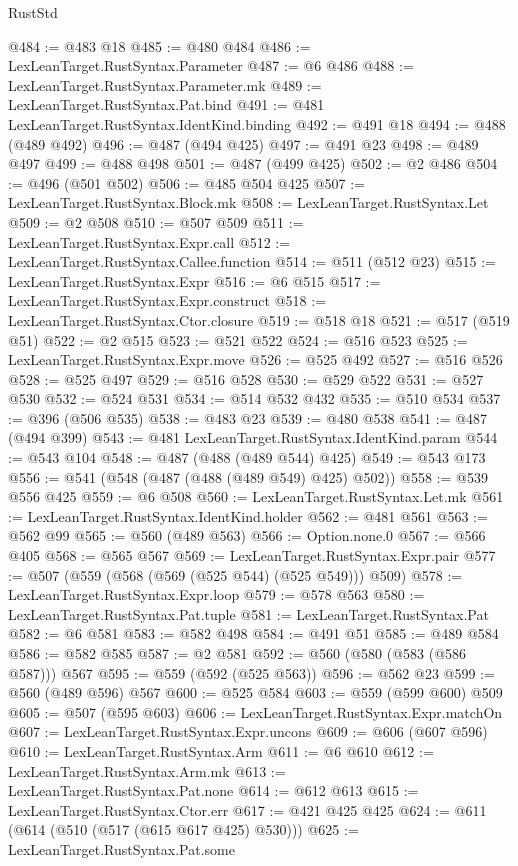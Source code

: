 \begin{lexlean}{RustStd}
\begin{coremodule}
@484 := @483 @18
@485 := @480 @484
@486 := LexLeanTarget.RustSyntax.Parameter
@487 := @6 @486
@488 := LexLeanTarget.RustSyntax.Parameter.mk
@489 := LexLeanTarget.RustSyntax.Pat.bind
@491 := @481 LexLeanTarget.RustSyntax.IdentKind.binding
@492 := @491 @18
@494 := @488 (@489 @492)
@496 := @487 (@494 @425)
@497 := @491 @23
@498 := @489 @497
@499 := @488 @498
@501 := @487 (@499 @425)
@502 := @2 @486
@504 := @496 (@501 @502)
@506 := @485 @504 @425
@507 := LexLeanTarget.RustSyntax.Block.mk
@508 := LexLeanTarget.RustSyntax.Let
@509 := @2 @508
@510 := @507 @509
@511 := LexLeanTarget.RustSyntax.Expr.call
@512 := LexLeanTarget.RustSyntax.Callee.function
@514 := @511 (@512 @23)
@515 := LexLeanTarget.RustSyntax.Expr
@516 := @6 @515
@517 := LexLeanTarget.RustSyntax.Expr.construct
@518 := LexLeanTarget.RustSyntax.Ctor.closure
@519 := @518 @18
@521 := @517 (@519 @51)
@522 := @2 @515
@523 := @521 @522
@524 := @516 @523
@525 := LexLeanTarget.RustSyntax.Expr.move
@526 := @525 @492
@527 := @516 @526
@528 := @525 @497
@529 := @516 @528
@530 := @529 @522
@531 := @527 @530
@532 := @524 @531
@534 := @514 @532 @432
@535 := @510 @534
@537 := @396 (@506 @535)
@538 := @483 @23
@539 := @480 @538
@541 := @487 (@494 @399)
@543 := @481 LexLeanTarget.RustSyntax.IdentKind.param
@544 := @543 @104
@548 := @487 (@488 (@489 @544) @425)
@549 := @543 @173
@556 := @541 (@548 (@487 (@488 (@489 @549) @425) @502))
@558 := @539 @556 @425
@559 := @6 @508
@560 := LexLeanTarget.RustSyntax.Let.mk
@561 := LexLeanTarget.RustSyntax.IdentKind.holder
@562 := @481 @561
@563 := @562 @99
@565 := @560 (@489 @563)
@566 := Option.none.{0}
@567 := @566 @405
@568 := @565 @567
@569 := LexLeanTarget.RustSyntax.Expr.pair
@577 := @507 (@559 (@568 (@569 (@525 @544) (@525 @549))) @509)
@578 := LexLeanTarget.RustSyntax.Expr.loop
@579 := @578 @563
@580 := LexLeanTarget.RustSyntax.Pat.tuple
@581 := LexLeanTarget.RustSyntax.Pat
@582 := @6 @581
@583 := @582 @498
@584 := @491 @51
@585 := @489 @584
@586 := @582 @585
@587 := @2 @581
@592 := @560 (@580 (@583 (@586 @587))) @567
@595 := @559 (@592 (@525 @563))
@596 := @562 @23
@599 := @560 (@489 @596) @567
@600 := @525 @584
@603 := @559 (@599 @600) @509
@605 := @507 (@595 @603)
@606 := LexLeanTarget.RustSyntax.Expr.matchOn
@607 := LexLeanTarget.RustSyntax.Expr.uncons
@609 := @606 (@607 @596)
@610 := LexLeanTarget.RustSyntax.Arm
@611 := @6 @610
@612 := LexLeanTarget.RustSyntax.Arm.mk
@613 := LexLeanTarget.RustSyntax.Pat.none
@614 := @612 @613
@615 := LexLeanTarget.RustSyntax.Ctor.err
@617 := @421 @425 @425
@624 := @611 (@614 (@510 (@517 (@615 @617 @425) @530)))
@625 := LexLeanTarget.RustSyntax.Pat.some

\end{coremodule}
\end{lexlean}
